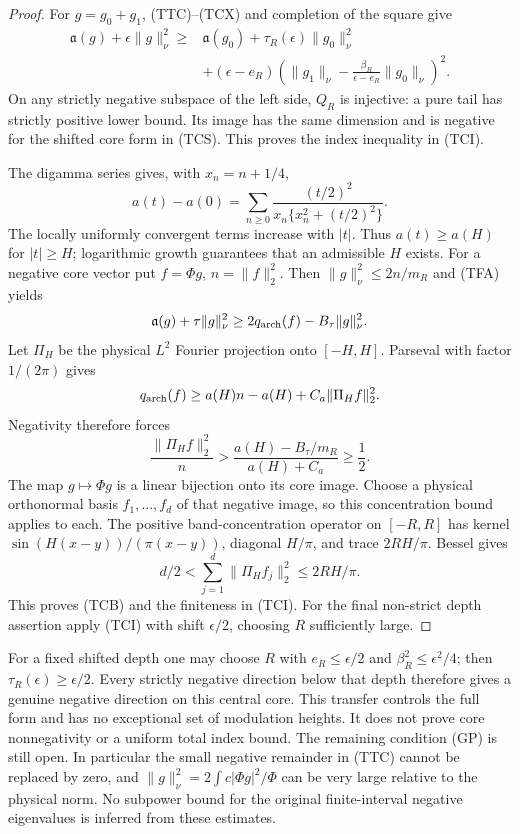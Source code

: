 \documentclass[11pt]{article}
\theoremstyle{remark}\newtheorem{remark}[theorem]{Remark}
\begin{document}
\begin{proof}
For $g=g_0+g_1$, (TTC)--(TCX) and completion of the square give
\[
\begin{split}
 \mathfrak a(g)+\epsilon\|g\|_\nu^2
 \ge{}&\mathfrak a(g_0)+\tau_R(\epsilon)\|g_0\|_\nu^2\\
 &+(\epsilon-e_R)
       \left(\|g_1\|_\nu-
            \frac{\beta_R}{\epsilon-e_R}\|g_0\|_\nu\right)^2.
\end{split}                                                   \tag{TCS}
\]
On any strictly negative subspace of the left side, $Q_R$ is
injective: a pure tail has strictly positive lower bound.
Its image has the same dimension and is negative for the shifted
core form in (TCS). This proves the index inequality in (TCI).

The digamma series \cite[eq.~(5.7.6), away from its poles]{DLMFGamma}
gives, with $x_n=n+1/4$,
\[
 a(t)-a(0)=\sum_{n\ge0}
       \frac{(t/2)^2}{x_n\{x_n^2+(t/2)^2\}}.
\]
The locally uniformly convergent terms increase with $|t|$.
Thus $a(t)\ge a(H)$ for $|t|\ge H$; logarithmic growth guarantees
that an admissible $H$ exists.
For a negative core vector put $f=\Phi g$, $n=\|f\|_2^2$.
Then $\|g\|_\nu^2\le2n/m_R$ and (TFA) yields
\[
 \mathfrak a(g)+\tau\|g\|_\nu^2
                 \ge2q_{\rm arch}(f)-B_\tau\|g\|_\nu^2.
\]
Let $\Pi_H$ be the physical $L^2$ Fourier projection onto
$[-H,H]$. Parseval with factor $1/(2\pi)$ gives
\[
 q_{\rm arch}(f)\ge a(H)n-{a(H)+C_a}\|\Pi_Hf\|_2^2.
\]
Negativity therefore forces
\[
 \frac{\|\Pi_Hf\|_2^2}{n}
   >\frac{a(H)-B_\tau/m_R}{a(H)+C_a}\ge\frac12.
\]
The map $g\mapsto\Phi g$ is a linear bijection onto its core
image. Choose a physical orthonormal basis $f_1,\ldots,f_d$ of
that negative image, so this concentration bound applies to each.
The positive band-concentration operator on $[-R,R]$ has kernel
$\sin(H(x-y))/(\pi(x-y))$, diagonal $H/\pi$, and trace $2RH/\pi$.
Bessel gives
\[
 d/2<\sum_{j=1}^d\|\Pi_Hf_j\|_2^2\le2RH/\pi.
\]
This proves (TCB) and the finiteness in (TCI).
For the final non-strict depth assertion apply (TCI) with shift
$\epsilon/2$, choosing $R$ sufficiently large.
\end{proof}

For a fixed shifted depth one may choose $R$ with
$e_R\le\epsilon/2$ and $\beta_R^2\le\epsilon^2/4$;
then $\tau_R(\epsilon)\ge\epsilon/2$. Every strictly negative
direction below that depth therefore gives a genuine negative
direction on this central core. This transfer controls the full
form and has no exceptional set of modulation heights.
It does not prove core nonnegativity or a uniform total index bound.
The remaining condition (GP) is still open. In particular the small
negative remainder in (TTC) cannot be replaced by zero, and
$\|g\|_\nu^2=2\int c|\Phi g|^2/\Phi$ can be very large relative
to the physical norm. No subpower bound for the original
finite-interval negative eigenvalues is inferred from these estimates.
\end{document}
